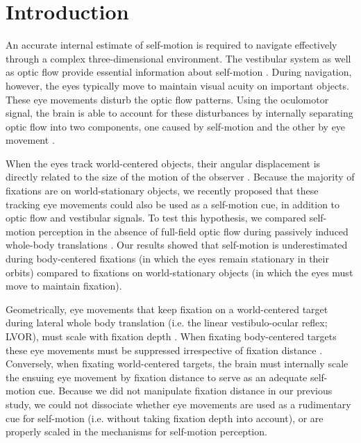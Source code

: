 \section{Introduction}

An accurate internal estimate of self-motion is required to navigate effectively through a complex three-dimensional environment. The vestibular system as well as optic flow provide essential information about self-motion \cite{gibson1955, benson1986, harris2000, israel1989, angelaki2005, carriot2013, chen2010}. During navigation, however, the eyes typically move to maintain visual acuity on important objects. These eye movements disturb the optic flow patterns. Using the oculomotor signal, the brain is able to account for these disturbances by internally separating optic flow into two components, one caused by self-motion and the other by eye movement \cite{warren1988, royden1992, freeman1998, lappe1999}.

When the eyes track world-centered objects, their angular displacement is directly related to the size of the motion of the observer \cite{schwarz1989, paige1998, mchenry2000, medendorp2002}. Because  the majority of fixations are on world-stationary  objects, we recently proposed that these tracking eye movements could also be used as a self-motion cue, in addition to optic flow and vestibular signals. To test this hypothesis, we compared self-motion perception in the absence of full-field optic flow during passively induced whole-body translations \cite{clemens2015a}. Our results showed that self-motion is underestimated during body-centered fixations (in which the eyes remain stationary in their orbits) compared to fixations on world-stationary objects (in which the eyes must move to maintain fixation).

Geometrically, eye movements that keep fixation on a world-centered target during lateral whole body translation (i.e. the linear vestibulo-ocular reflex; LVOR), must scale with fixation depth \cite{angelaki2004}. When fixating body-centered targets these eye movements must be suppressed irrespective of fixation distance \cite{angelaki2004}. Conversely, when fixating world-centered targets, the brain must internally scale the ensuing eye movement by fixation distance to serve as an adequate self-motion cue. Because we did not manipulate fixation distance in our previous study, we could not dissociate whether eye movements are used as a rudimentary cue for self-motion (i.e. without taking fixation depth into account), or are properly scaled in the mechanisms for self-motion perception.

